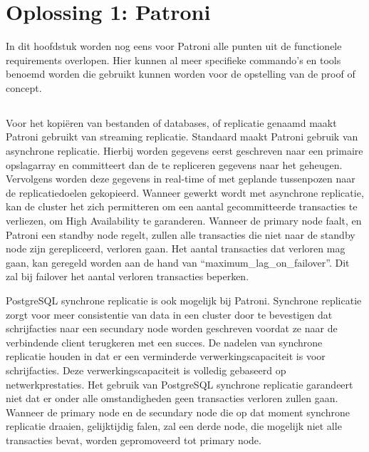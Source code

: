 
\chapter{Oplossing 1: Patroni}
\label{ch:Oplossing 1: Patroni}

In dit hoofdstuk worden nog eens voor Patroni alle punten uit de functionele requirements overlopen. Hier kunnen al meer specifieke commando's en tools benoemd worden die gebruikt kunnen worden voor de opstelling van de proof of concept.

\section{}
\label{sec:Redundantie/Replicatie}

Voor het kopiëren van bestanden of databases, of replicatie genaamd maakt Patroni gebruikt van streaming replicatie. Standaard maakt Patroni gebruik van asynchrone replicatie. Hierbij worden gegevens eerst geschreven naar een primaire opslagarray en committeert dan de te repliceren gegevens naar het geheugen. Vervolgens worden deze gegevens in real-time of met geplande tussenpozen naar de replicatiedoelen gekopieerd.
Wanneer gewerkt wordt met asynchrone replicatie, kan de cluster het zich permitteren om een aantal gecommitteerde transacties te verliezen, om High Availability te garanderen. Wanneer de primary node faalt, en Patroni een standby node regelt, zullen alle transacties die niet naar de standby node zijn gerepliceerd, verloren gaan. Het aantal transacties dat verloren mag gaan, kan geregeld worden aan de hand van “maximum\_lag\_on\_failover”. Dit zal bij failover het aantal verloren transacties beperken.

PostgreSQL synchrone replicatie is ook mogelijk bij Patroni. Synchrone replicatie zorgt voor meer consistentie van data in een cluster door te bevestigen dat schrijfacties naar een secundary node worden geschreven voordat ze naar de verbindende client terugkeren met een succes. De nadelen van synchrone replicatie houden in dat er een verminderde verwerkingscapaciteit is voor schrijfacties. Deze verwerkingscapaciteit is volledig gebaseerd op netwerkprestaties. Het gebruik van PostgreSQL synchrone replicatie garandeert niet dat er onder alle omstandigheden geen transacties verloren zullen gaan. Wanneer de primary node en de secundary node die op dat moment synchrone replicatie draaien, gelijktijdig falen, zal een derde node, die mogelijk niet alle transacties bevat, worden gepromoveerd tot primary node.

